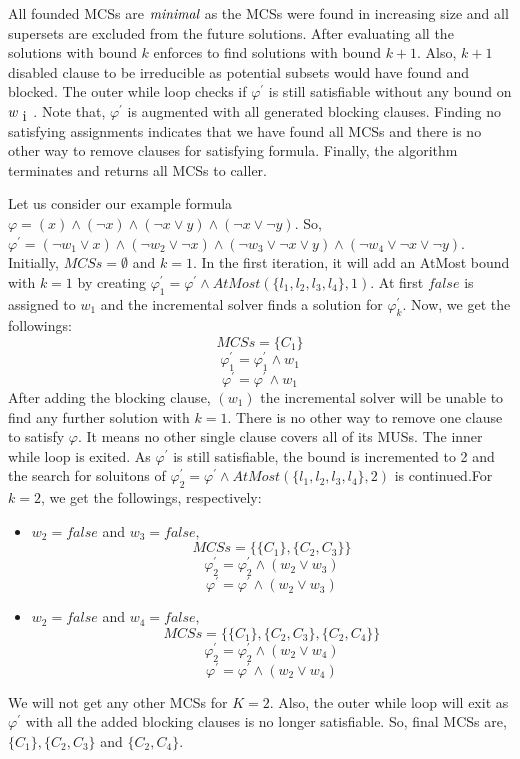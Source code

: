 All founded MCSs are $\emph{minimal}$ as the MCSs were found in increasing size and all supersets are excluded from the future solutions. After evaluating all the solutions with bound $k$ enforces to find solutions with bound $k+1$. Also, $k+1$ disabled clause to be irreducible as potential subsets would have found and blocked.\newline
The outer while loop checks if $\varphi^{\prime}$ is still satisfiable without any bound on $w_{\text i}$. Note that, $\varphi^{\prime}$ is augmented with all  generated blocking clauses. Finding no satisfying assignments indicates that we have found all MCSs and there is no other way to remove clauses for satisfying formula. Finally, the algorithm terminates and returns all MCSs to caller.
\begin{example}
Let us consider our example formula $\varphi=(x)\wedge(\neg x)\wedge(\neg x\vee y)\wedge(\neg x \vee \neg y)$. So, $\varphi^{\prime}=(\neg w_{1}\vee x)\wedge(\neg w_{2}\vee \neg x)\wedge(\neg w_{3}\vee \neg x\vee y)\wedge(\neg w_{4}\vee \neg x \vee \neg y)$. Initially, $MCSs=\emptyset$ and $k=1$.\newline
In the first iteration, it will add an AtMost bound with $k=1$ by creating $\varphi^{\prime}_{1}=\varphi^{\prime} \wedge AtMost(\{l_{1},l_{2},l_{3},l_{4}\},1)$. At first $false$ is assigned to $w_{1}$ and the incremental solver finds a solution for $\varphi^{\prime}_{k}$. Now, we get the followings:
$$MCSs=\{C_{1}\}$$
$$\varphi^{\prime}_{1}=\varphi^{\prime}_{1} \wedge w_{1}$$
$$\varphi^{\prime}=\varphi^{\prime} \wedge w_{1}$$
After adding the blocking clause, $(w_{1})$ the incremental solver will be unable to find any further solution with $k=1$. There is no other way to remove one clause to satisfy $\varphi$. It means no other single clause covers all of its MUSs. The inner while loop is exited.\newline
As $\varphi^{\prime}$ is still satisfiable, the bound is incremented to 2 and the search for soluitons of $\varphi^{\prime}_{2}=\varphi^{\prime} \wedge AtMost(\{l_{1},l_{2},l_{3},l_{4}\},2)$ is continued.For $k=2$, we get the followings, respectively:
\begin{itemize}
	\item $w_{2}=false$ and $w_{3}=false,$
	$$MCSs=\{\{C_{1}\}, \{C_{2}, C_{3}\}\}$$
	$$\varphi^{\prime}_{2}=\varphi^{\prime}_{2} \wedge (w_{2}\vee w_{3})$$
	$$\varphi^{\prime}=\varphi^{\prime} \wedge (w_{2}\vee w_{3})$$
	\item $w_{2}=false$ and $w_{4}=false,$
	$$MCSs=\{\{C_{1}\}, \{C_{2}, C_{3}\}, \{C_{2}, C_{4}\}\}$$
	$$\varphi^{\prime}_{2}=\varphi^{\prime}_{2} \wedge (w_{2}\vee w_{4})$$
	$$\varphi^{\prime}=\varphi^{\prime} \wedge (w_{2}\vee w_{4})$$
\end{itemize}
We will not get any other MCSs for $K=2$. Also, the outer while loop will exit as $\varphi^{\prime}$ with all the added blocking clauses is no longer satisfiable. So, final MCSs are, $\{C_{1}\}, \{C_{2}, C_{3}\}$ and $\{C_{2}, C_{4}\}$.
\end{example}
